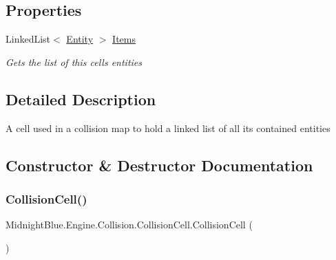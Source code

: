 \subsection*{Properties}
\begin{DoxyCompactItemize}
\item 
Linked\+List$<$ \hyperlink{class_midnight_blue_1_1_engine_1_1_entity_component_1_1_entity}{Entity} $>$ \hyperlink{class_midnight_blue_1_1_engine_1_1_collision_1_1_collision_cell_a09d161aa9960e0ab945d60500dabc523}{Items}
\begin{DoxyCompactList}\small\item\em Gets the list of this cells entities \end{DoxyCompactList}\end{DoxyCompactItemize}


\subsection{Detailed Description}
A cell used in a collision map to hold a linked list of all its contained entities 



\subsection{Constructor \& Destructor Documentation}
\hypertarget{class_midnight_blue_1_1_engine_1_1_collision_1_1_collision_cell_a72b70e1bf34972fcddc6433eee2cd75a}{}\label{class_midnight_blue_1_1_engine_1_1_collision_1_1_collision_cell_a72b70e1bf34972fcddc6433eee2cd75a} 
\subsubsection{\texorpdfstring{Collision\+Cell()}{CollisionCell()}}
{\footnotesize\ttfamily Midnight\+Blue.\+Engine.\+Collision.\+Collision\+Cell.\+Collision\+Cell (\begin{DoxyParamCaption}{ }\end{DoxyParamCaption})\hspace{0.3cm}{\ttfamily [inline]}}



